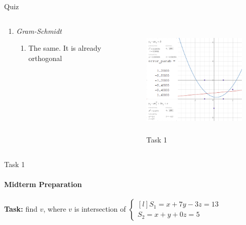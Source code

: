 \documentclass[aspectratio=169]{beamer}
\begin{document}
\begin{frame}[t]{Quiz}
{\begin{columns}[T,onlytextwidth]
\begin{column}{0.49\textwidth}
\begin{enumerate}
                        \begin{enumerate}
                            \item Parabola (or any 2nd order polynomial curve)
                            \item $a = 0.4,\ b=-0.2,\ c = 0.2;\ SE = 6.4$
                        \end{enumerate}
                    \item \textit{Gram-Schmidt}
                    \begin{enumerate}
                        \item The same. It is already orthogonal \heartsuit 
                    \end{enumerate}
                \end{enumerate}
            \end{column}
            \begin{column}{0.49\textwidth}
                \vspace{-1.2cm}
                \begin{figure}[H]
                    \centering\includegraphics[height=5.5cm,width=1\textwidth,keepaspectratio]{quiz_ans.png}
                    \caption*{\Large Task 1}
                    \label{fig:quiz_ans}
                \end{figure}
            \end{column}
        \end{columns}
    }
\end{frame}

\begin{frame}[t]{Task 1}
    \framesubtitle{Midterm Preparation}
    \textbf{Task:} find $v$, where $v$ is intersection of $
        \left\{\begin{matrix*}[l]
        S_1 = x+7y-3z=13\\ 
        S_2=x+y+0z=5
        \end{matrix*}\right.
    $

\end{frame}
\end{document}
